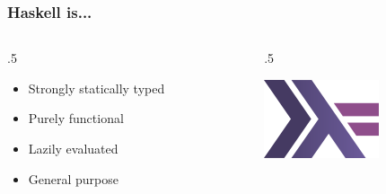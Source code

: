 \documentclass[17pt]{beamer}
\renewcommand{\(}[1]{\begin{columns}[#1]}
\renewcommand{\)}{\end{columns}}
\newcommand{\<}[1]{\begin{column}{#1}}
\renewcommand{\>}{\end{column}}
\begin{document}
\begin{frame}
  \frametitle{Haskell is...}
  \({c}
  \<{.5\textwidth}
  \begin{center}
    \begin{itemize}
    \item Strongly statically typed
    \item Purely functional
    \item Lazily evaluated
    \item General purpose
    \end{itemize}
  \end{center}
  \>
  \<{.5\textwidth}
  \begin{center}
    \includegraphics[width=.5\textwidth]{img/haskell}
  \end{center}
  \>
  \)
\end{frame}
\end{document}
